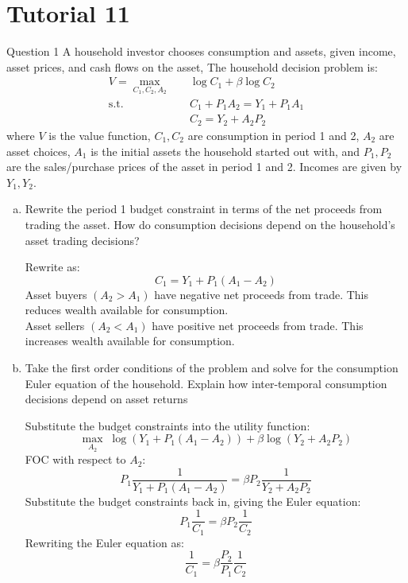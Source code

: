 \documentclass[a4paper]{article}
\begin{document}
\section{Tutorial 11}
	\begin{questionbox}{Question 1}
		A household investor chooses consumption and assets, given income, asset prices, and cash ﬂows on the asset, The household decision problem is:
		\begin{align*}
			V = \max_{C_1,C_2,A_2} \quad &\log C_1 + \beta\log C_2\\
			\text{s.t.}\quad &C_1 + P_1 A_2= Y_1 + P_1 A_1\\
			&C_2 = Y_2 + A_2 P_2
		\end{align*}
		where \( V \) is the value function, \( C_1,C_2 \) are consumption in period 1 and 2, \( A_2 \) are asset choices, \( A_1 \) is the initial assets the household started out with, and \( P_1,P_2 \) are the sales/purchase prices of the asset in period 1 and 2. Incomes are given by \( Y_1,Y_2 \).
		\begin{enumerate}[(a)]
			\item Rewrite the period 1 budget constraint in terms of the net proceeds from trading the asset. How do consumption decisions depend on the household's asset trading decisions?
			\begin{explanationbox}
				Rewrite as:
				\[
					C_1 = Y_1 + P_1 (A_1 - A_2)
				\]
				Asset buyers \( (A_2 > A_1) \) have negative net proceeds from trade. This reduces wealth available for consumption.\\
				Asset sellers \( (A_2 < A_1) \) have positive net proceeds from trade. This increases wealth available for consumption.
			\end{explanationbox}
			\item Take the ﬁrst order conditions of the problem and solve for the consumption Euler equation of the household. Explain how inter-temporal consumption decisions depend on asset returns
			\begin{explanationbox}
				Substitute the budget constraints into the utility function:
				\[
					\max_{A_2}\;\log(Y_1 + P_1 (A_1 - A_2)) + \beta\log (Y_2 + A_2 P_2)
				\]
				FOC with respect to \( A_2 \):
				\[
					P_1\frac{1}{Y_1 + P_1 (A_1 - A_2)} = \beta P_2\frac{1}{Y_2 + A_2 P_2}
				\]
				Substitute the budget constraints back in, giving the Euler equation:
				\[
					P_1\frac{1}{C_1} = \beta P_2\frac{1}{C_2}
				\]
				Rewriting the Euler equation as:
				\[
					\frac{1}{C_1} = \beta \frac{P_2}{P_1}\frac{1}{C_2}
\]
\end{explanationbox}
\end{enumerate}
\end{questionbox}
\end{document}
